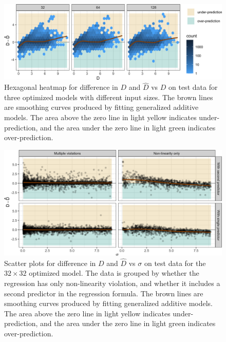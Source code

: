 \documentclass[]{interact}
\theoremstyle{plain}%
\theoremstyle{definition}
\theoremstyle{remark}
\begin{document}
\begin{figure}[!h]

{\centering \includegraphics[width=1\linewidth]{paper_files/figure-latex/model-performance-1} 

}

\caption{Hexagonal heatmap for difference in $D$ and $\hat{D}$ vs $D$ on test data for three optimized models with different input sizes. The brown lines are smoothing curves produced by fitting generalized additive models. The area above the zero line in light yellow indicates under-prediction, and the area under the zero line in light green indicates over-prediction.}\label{fig:model-performance}
\end{figure}

\begin{figure}[!h]

{\centering \includegraphics[width=1\linewidth]{paper_files/figure-latex/over-under-1} 

}

\caption{Scatter plots for difference in $D$ and $\hat{D}$ vs $\sigma$ on test data for the $32 \times 32$ optimized model. The data is grouped by whether the regression has only non-linearity violation, and whether it includes a second predictor in the regression formula. The brown lines are smoothing curves produced by fitting generalized additive models. The area above the zero line in light yellow indicates under-prediction, and the area under the zero line in light green indicates over-prediction.}\label{fig:over-under}
\end{figure}
\end{document}
